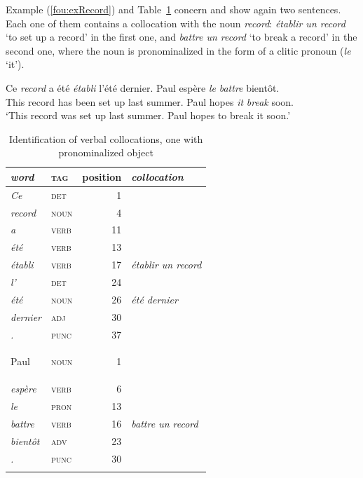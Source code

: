 \documentclass[output=paper]{langsci/langscibook}
\begin{document}
Example (\ref{fou:exRecord}) %
and Table~\ref{fou:fig3} concern  and show again two sentences. Each one of them contains a collocation with the noun \textit{record}: \textit{établir un record} `to set up a record' in the first one,  and \textit{battre un record} `to break a record' in the second one, where the noun is pronominalized in the form of a clitic pronoun (\textit{le} `it').

\ea\label{fou:exRecord}
 \gll Ce \textit{record} a été \textit{établi} l'été dernier. Paul espère \textit{le} \textit{battre} bientôt.\\
 This record has been {set up} last summer. Paul hopes \textit{it} \textit{break} soon.\\
 \glt `This record was set up last summer. Paul hopes to break it soon.'
\z

\begin{table}[h]
  {\small 
    \begin{tabular}{>{\itshape}l>{\scshape}lr>{\itshape}l}
      \lsptoprule
      \normalfont word & \normalfont tag & position & \normalfont collocation \\ %
      \midrule
      Ce     &	det &	1	\\
      record &	noun	 & 4	\\	
      a	     &  verb & 	11	\\
      été    &  verb & 	13		\\
      établi & verb	 & 17	 & 	établir un record\\
      l'     &	det & 	24	\\
      été	 & noun	 & 26		 & 	été dernier\\
      dernier & 	adj	 & 30			\\
      .	 & punc	 & 37		\\\tablevspace

      Paul & 	noun	 & 1\\
      espère & 	verb & 	6	\\
      le	 & pron & 13	\\
      battre & 	verb	 & 16	  & 	battre un record\\
      bientôt & adv	 & 23			\\
      .	 & punc & 	30			\tabularnewline
      \lspbottomrule
\end{tabular}
  }
 \caption{\label{fou:fig3}Identification of verbal collocations, one with pronominalized object}
\end{table} 
\end{document}
